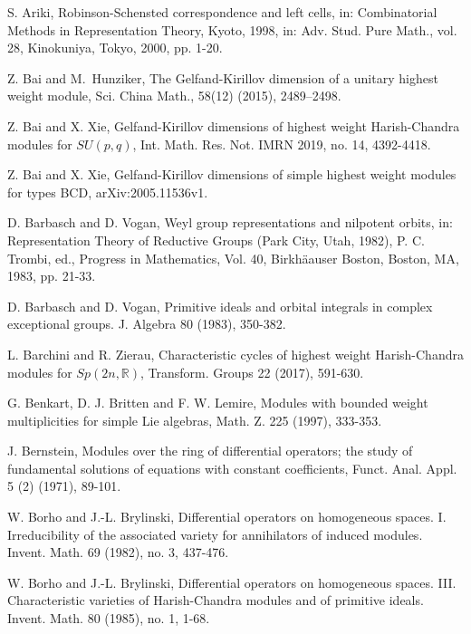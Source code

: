 \documentclass{amsart}[12pt]
\numberwithin{equation}{section}
\begin{document}
\begin{thebibliography}{99}

 S. Ariki, Robinson-Schensted correspondence and left cells, in: Combinatorial Methods in Representation Theory, Kyoto, 1998, in: Adv. Stud. Pure Math., vol. 28, Kinokuniya, Tokyo, 2000, pp. 1-20.


Z. Bai and M.~Hunziker,  The Gelfand-Kirillov dimension of a unitary highest weight  module,
 Sci. China Math., 58(12) (2015), 2489--2498.

Z. Bai and X. Xie, Gelfand-Kirillov dimensions of highest weight Harish-Chandra modules for $SU(p,q)$,  Int. Math. Res. Not. IMRN 2019, no. 14, 4392-4418.

Z. Bai and X. Xie, Gelfand-Kirillov dimensions of simple highest weight modules for types BCD,  arXiv:2005.11536v1.




D. Barbasch and D. Vogan, Weyl group representations and nilpotent orbits, in: Representation Theory of Reductive Groups (Park City, Utah, 1982), P. C. Trombi, ed., Progress in Mathematics, Vol. 40, Birkh\"{a}auser Boston, Boston, MA, 1983, pp. 21-33.

D. Barbasch and D. Vogan, Primitive ideals and orbital integrals in complex exceptional groups.
J. Algebra 80 (1983), 350-382.

L. Barchini and R. Zierau, Characteristic cycles of highest weight Harish-Chandra modules for $Sp(2n, \mathbb{R})$, Transform. Groups 22 (2017),  591-630.


G. Benkart, D. J. Britten and F. W. Lemire,  Modules with bounded weight multiplicities for simple Lie algebras,  Math. Z. 225 (1997), 333-353.

J. Bernstein, Modules over the ring of differential operators; the study of fundamental solutions of equations with constant coefficients, Funct. Anal. Appl. 5 (2) (1971), 89-101.


 W. Borho and J.-L. Brylinski, Differential operators on homogeneous spaces. I. Irreducibility of the associated variety for annihilators of induced modules. Invent. Math. 69 (1982), no. 3, 437-476.

 W. Borho and J.-L. Brylinski,  Differential operators on homogeneous spaces. III. Characteristic varieties of Harish-Chandra modules and of primitive ideals. { Invent. Math.} { 80} (1985), no. 1, 1-68.




\end{thebibliography}
\end{document}
